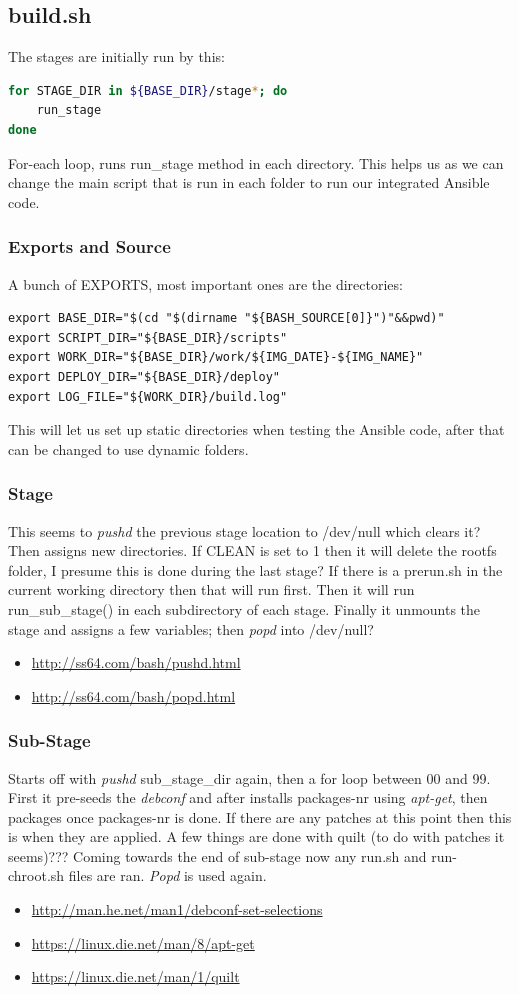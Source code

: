 \documentclass[12pt,a4paper]{report}
\begin{document}
\subsection{build.sh}
The stages are initially run by this:
\begin{lstlisting}[frame=single, language=bash]
for STAGE_DIR in ${BASE_DIR}/stage*; do
	run_stage
done
\end{lstlisting}
For-each loop, runs run\_stage method in each directory. This helps us as we can change the main script that is run in each folder to run our integrated Ansible code.
\subsubsection{Exports and Source}
A bunch of EXPORTS, most important ones are the directories:
\begin{lstlisting}[frame=single]
export BASE_DIR="$(cd "$(dirname "${BASH_SOURCE[0]}")"&&pwd)"
export SCRIPT_DIR="${BASE_DIR}/scripts"
export WORK_DIR="${BASE_DIR}/work/${IMG_DATE}-${IMG_NAME}"
export DEPLOY_DIR="${BASE_DIR}/deploy"
export LOG_FILE="${WORK_DIR}/build.log"
\end{lstlisting}
This will let us set up static directories when testing the Ansible code, after that can be changed to use dynamic folders.
\subsubsection{Stage}
This seems to \textit{pushd} the previous stage location to /dev/null which clears it? Then assigns new directories. If CLEAN is set to 1 then it will delete the rootfs folder, I presume this is done during the last stage? If there is a prerun.sh in the current working directory then that will run first. Then it will run run\_sub\_stage() in each subdirectory of each stage. Finally it unmounts the stage and assigns a few variables; then \textit{popd} into /dev/null?
\begin{itemize}
\item{\url{http://ss64.com/bash/pushd.html}}
\item{\url{http://ss64.com/bash/popd.html}}
\end{itemize}
\subsubsection{Sub-Stage}
Starts off with \textit{pushd} sub\_stage\_dir again, then a for loop between 00 and 99. First it pre-seeds the \textit{debconf} and after installs packages-nr using \textit{apt-get}, then packages once packages-nr is done. If there are any patches at this point then this is when they are applied. A few things are done with quilt (to do with patches it seems)??? Coming towards the end of sub-stage now any run.sh and run-chroot.sh files are ran. \textit{Popd} is used again.
\begin{itemize}
\item{\url{http://man.he.net/man1/debconf-set-selections}}
\item{\url{https://linux.die.net/man/8/apt-get}}
\item{\url{https://linux.die.net/man/1/quilt}}
\end{itemize}
\end{document}
